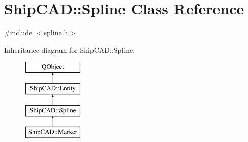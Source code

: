 \hypertarget{classShipCAD_1_1Spline}{\section{Ship\-C\-A\-D\-:\-:Spline Class Reference}
\label{classShipCAD_1_1Spline}
}


{\ttfamily \#include $<$spline.\-h$>$}

Inheritance diagram for Ship\-C\-A\-D\-:\-:Spline\-:\begin{figure}[H]
\begin{center}
\leavevmode
\includegraphics[height=4.000000cm]{classShipCAD_1_1Spline}
\end{center}
\end{figure}
